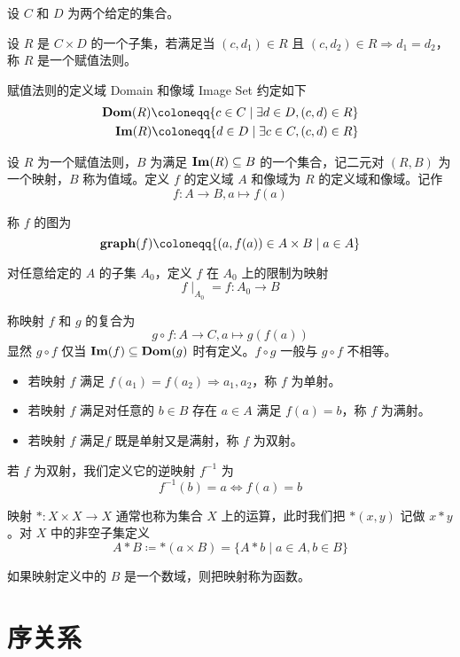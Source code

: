 设 $C$ 和 $D$ 为两个给定的集合。

\begin{definition}[赋值法则]
	设 $R$ 是 $C\times D$ 的一个子集，若满足当 $(c,d_1)\in R$ 且 $(c,d_2)\in R \Rightarrow d_1=d_2$，称 $R$ 是一个赋值法则。
\end{definition}

赋值法则的定义域 Domain 和像域 Image Set 约定如下
\[ \begin{aligned}
		\dom(R) \coloneqq  \{c\in C \mid \exists d \in D, (c,d) \in R\} \\
		\im(R) \coloneqq  \{d\in D \mid \exists c \in C, (c,d) \in R\}  \\
	\end{aligned} \]

\begin{definition}
	设 $R$ 为一个赋值法则，$B$ 为满足 $\operatorname{\mathbf{Im}}(R) \subseteq B$ 的一个集合，记二元对 $(R,B)$ 为一个映射，$B$ 称为值域。定义 $f$ 的定义域 $A$ 和像域为 $R$ 的定义域和像域。记作
	\[ f:A\to B, a\mapsto f(a) \]
\end{definition}

称 $f$ 的图为
\[ \graph(f) \coloneqq  \{(a,f(a)) \in A\times B \mid a \in A\}\]

对任意给定的 $A$ 的子集 $A_0$，定义 $f$ 在 $A_0$ 上的限制为映射
\[ f \mid_{A_0} = f : A_0 \to B\]

称映射 $f$ 和 $g$ 的复合为
\[ g\circ f: A \to C, a \mapsto g(f(a))\]
显然 $g \circ f$ 仅当 $\operatorname{\mathbf{Im}}(f) \subseteq \operatorname{\mathbf{Dom}}(g)$ 时有定义。$f\circ g$ 一般与 $g \circ f$ 不相等。

\begin{itemize}
	\item 若映射 $f$ 满足 $f(a_1) = f(a_2) \Rightarrow a_1,a_2$，称 $f$ 为单射。
	\item 若映射 $f$ 满足对任意的 $b\in B$ 存在 $a\in A$ 满足 $f(a)=b$，称 $f$ 为满射。
	\item 若映射 $f$ 满足$f$ 既是单射又是满射，称 $f$ 为双射。
\end{itemize}

若 $f$ 为双射，我们定义它的逆映射 $f^{-1}$ 为
\[ f^{-1}(b) =  a \Leftrightarrow f(a) = b\]

映射 $\ast: X\times X \to X$ 通常也称为集合 $X$ 上的运算，此时我们把 $\ast(x,y)$ 记做 $x \ast y$。对 $X$ 中的非空子集定义
\[ A \ast B \coloneqq  \ast(a\times B) = \{A \ast b \mid a \in A, b\in B\}\]

如果映射定义中的 $B$ 是一个数域，则把映射称为函数。

\section{序关系}


